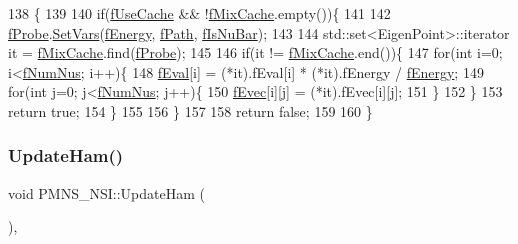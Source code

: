 \begin{DoxyCode}
138 \{
139 
140   \textcolor{keywordflow}{if}(\hyperlink{classOscProb_1_1PMNS__Base_ad28c12ef897b5555eda509ea55c99107}{fUseCache} && !\hyperlink{classOscProb_1_1PMNS__Base_a8159424f20197a3a7145fe3bf2c11176}{fMixCache}.empty())\{
141 
142     \hyperlink{classOscProb_1_1PMNS__Base_ab1fe4800ee3ae48df4fc942dce00e0d3}{fProbe}.\hyperlink{structOscProb_1_1EigenPoint_a2e293e0820715950ec8fb370e8cc9477}{SetVars}(\hyperlink{classOscProb_1_1PMNS__Base_a2800af6d436972f3e900867790c046b0}{fEnergy}, \hyperlink{classOscProb_1_1PMNS__Base_a849437aa8891fe042e86886ce8f81c6e}{fPath}, \hyperlink{classOscProb_1_1PMNS__Base_a0ebaeaefab36a3ff381c6293faedfdd6}{fIsNuBar});
143     
144     std::set<EigenPoint>::iterator it = \hyperlink{classOscProb_1_1PMNS__Base_a8159424f20197a3a7145fe3bf2c11176}{fMixCache}.find(\hyperlink{classOscProb_1_1PMNS__Base_ab1fe4800ee3ae48df4fc942dce00e0d3}{fProbe});
145 
146     \textcolor{keywordflow}{if}(it != \hyperlink{classOscProb_1_1PMNS__Base_a8159424f20197a3a7145fe3bf2c11176}{fMixCache}.end())\{
147       \textcolor{keywordflow}{for}(\textcolor{keywordtype}{int} i=0; i<\hyperlink{classOscProb_1_1PMNS__Base_a24bb74bed63569dfe88b18fa6a08060e}{fNumNus}; i++)\{
148         \hyperlink{classOscProb_1_1PMNS__Base_a6319c34d7decbb9d7d6da279c06e8c2d}{fEval}[i] = (*it).fEval[i] * (*it).fEnergy / \hyperlink{classOscProb_1_1PMNS__Base_a2800af6d436972f3e900867790c046b0}{fEnergy};
149         \textcolor{keywordflow}{for}(\textcolor{keywordtype}{int} j=0; j<\hyperlink{classOscProb_1_1PMNS__Base_a24bb74bed63569dfe88b18fa6a08060e}{fNumNus}; j++)\{
150           \hyperlink{classOscProb_1_1PMNS__Base_a87be137356c5f27ab83cab5e1298ef8f}{fEvec}[i][j] = (*it).fEvec[i][j];
151         \}
152       \}
153       \textcolor{keywordflow}{return} \textcolor{keyword}{true};
154     \}
155 
156   \}
157   
158   \textcolor{keywordflow}{return} \textcolor{keyword}{false};
159 
160 \}
\end{DoxyCode}
\mbox{\label{classOscProb_1_1PMNS__NSI_ab5c4f4644fbedb8835f6336c553805ce}} 
\subsubsection{\texorpdfstring{Update\+Ham()}{UpdateHam()}}
{\footnotesize\ttfamily void P\+M\+N\+S\+\_\+\+N\+S\+I\+::\+Update\+Ham (\begin{DoxyParamCaption}{ }\end{DoxyParamCaption})\hspace{0.3cm}{\ttfamily [protected]}, {\ttfamily [virtual]}}

